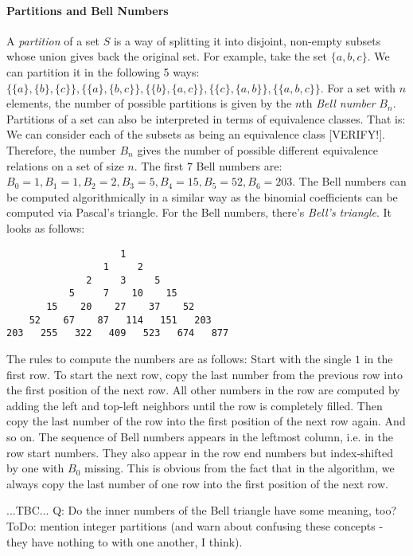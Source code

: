 \paragraph{Partitions and Bell Numbers}
\label{Sec:PartitionsOfSets}
A \emph{partition} of a set $S$ is a way of splitting it into disjoint, non-empty subsets whose union gives back the original set. For example, take the set $\{a,b,c\}$. We can partition it in the following 5 ways: $\{\{a\},\{b\},\{c\}\}, \{\{a\},\{b,c\}\}, \{\{b\},\{a,c\}\}, \{\{c\},\{a,b\}\}, \{\{a,b,c\}\}$. For a set with $n$ elements, the number of possible partitions is given by the $n$th \emph{Bell number} $B_n$. Partitions of a set can also be interpreted in terms of equivalence classes. That is: We can consider each of the subsets as being an equivalence class [VERIFY!]. Therefore, the number $B_n$ gives the number of possible different equivalence relations on a set of size $n$. The first $7$ Bell numbers are: $B_0=1, B_1=1, B_2=2, B_3=5, B_4=15, B_5=52, B_6=203$. The Bell numbers can be computed algorithmically in a similar way as the binomial coefficients can be computed via Pascal's triangle. For the Bell numbers, there's \emph{Bell's triangle}. It looks as follows:
\begin{center}  %
\begin{verbatim}
                    1
                 1     2
              2     3     5
           5     7    10    15
       15    20    27    37    52
    52    67    87   114   151   203
203   255   322   409   523   674   877
\end{verbatim}
\end{center}
The rules to compute the numbers are as follows: Start with the single $1$ in the first row. To start the next row, copy the last number from the previous row into the first position of the next row. All other numbers in the row are computed by adding the left and top-left neighbors until the row is completely filled. Then copy the last number of the row into the first position of the next row again. And so on. The sequence of Bell numbers appears in the leftmost column, i.e. in the row start numbers. They also appear in the row end numbers but index-shifted by one with $B_0$ missing. This is obvious from the fact that in the algorithm, we always copy the last number of one row into the first position of the next row.

...TBC... Q: Do the inner numbers of the Bell triangle have some meaning, too? ToDo: mention integer partitions (and warn about confusing these concepts - they have nothing to with one another, I think).

